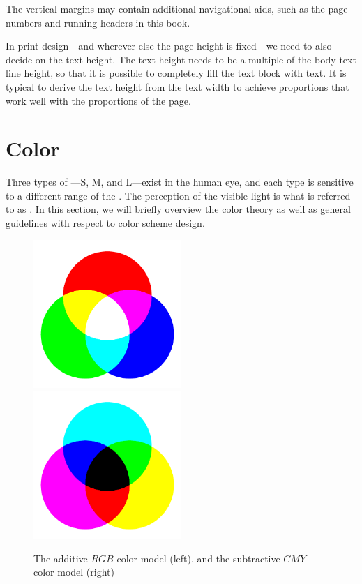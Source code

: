 The vertical margins may contain additional navigational aids, such as the page
numbers and running headers in this book.~\cite[sec.\,8.5.2]{bringhurst92}

In print design---and wherever else the page height is fixed---we need to also
decide on the text height. The text height needs to be a multiple of the body
text line height, so that it is possible to completely fill the text block with
text.  It is typical to derive the text height from the text width to achieve
proportions that work well with the proportions of the
page.~\cite[sec.\,8.4.2]{bringhurst92}

\section{Color}
Three types of ---S, M, and L---exist in the human eye, and
each type is sensitive to a different range of the .  The
perception of the visible light is what is referred to as . In this
section, we will briefly overview the color theory as well as general
guidelines with respect to color scheme design.

\begin{figure}
  \includegraphics[width=0.5\textwidth]{examples/03/rgb}%
  \includegraphics[width=0.5\textwidth]{examples/03/cmy}
  \caption{The additive $RGB$ color model (left), and the subtractive $CMY$
    color model (right)}
  \label{fig:color-models}
\end{figure}

